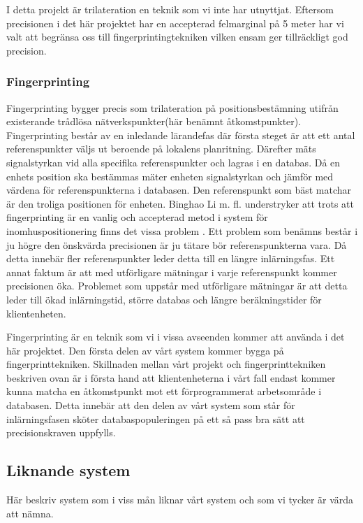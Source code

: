 \documentclass[swedish, a4paper,12pt]{article}
\begin{document}
I detta projekt är trilateration en teknik som vi inte har utnyttjat. Eftersom precisionen i det här projektet har en accepterad felmarginal på 5 meter har vi valt att begränsa oss till fingerprintingtekniken vilken ensam ger tillräckligt god precision.

\subsubsection{Fingerprinting} \label{fingerprinting}
Fingerprinting bygger precis som trilateration på positionsbestämning utifrån existerande trådlösa nätverkspunkter(här benämnt åtkomstpunkter). Fingerprinting består av en inledande lärandefas där första steget är att ett antal referenspunkter väljs ut beroende på lokalens planritning. Därefter mäts signalstyrkan vid alla specifika referenspunkter och lagras i en databas.%
Då en enhets position ska bestämmas mäter enheten signalstyrkan och jämför med värdena för referenspunkterna i databasen. Den referenspunkt som bäst matchar är den troliga positionen för enheten.\cite{IP1}\cite{jun2018low}
Binghao Li m. fl. understryker att trots att fingerprinting är en vanlig och accepterad metod i system för inomhuspositionering finns det vissa problem .\cite{IP1}
Ett problem som benämns består i ju högre den önskvärda precisionen är ju tätare bör referenspunkterna vara. Då detta innebär fler referenspunkter leder detta till en längre inlärningsfas. Ett annat faktum är att med utförligare mätningar i varje referenspunkt kommer precisionen öka. Problemet som uppstår med utförligare mätningar är att detta leder till ökad inlärningstid, större databas och längre beräkningstider för klientenheten.\cite{IP1}

Fingerprinting är en teknik som vi i vissa avseenden kommer att använda i det här projektet. Den första delen av vårt system kommer bygga på fingerprinttekniken. Skillnaden mellan vårt projekt och fingerprinttekniken beskriven ovan är i första hand att klientenheterna i vårt fall endast kommer kunna matcha en åtkomstpunkt mot ett förprogrammerat arbetsområde i databasen. Detta innebär att den delen av vårt system som står för inlärningsfasen sköter databaspopuleringen på ett så pass bra sätt att precisionskraven uppfylls.

\subsection{Liknande system}
Här beskriv system som i viss mån liknar vårt system och som vi tycker är värda att nämna.
\end{document}
